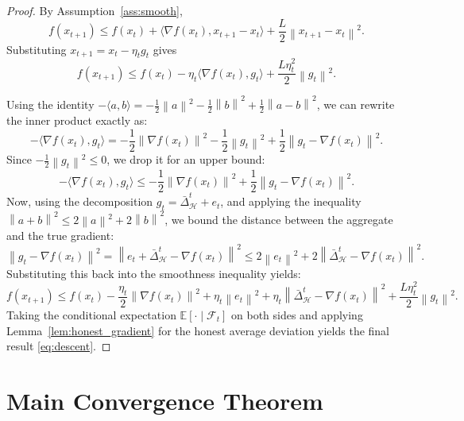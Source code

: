 \documentclass[11pt,a4paper]{article}
\theoremstyle{remark}
\newcommand{\E}{\mathbb{E}}
\newcommand{\F}{\mathcal{F}}
\newcommand{\HH}{\mathcal{H}}
\newcommand{\norm}[1]{\left\lVert #1 \right\rVert}
\begin{document}
\begin{proof}
By Assumption~\ref{ass:smooth},
\[
    f(x_{t+1})
    \le
    f(x_t)
    +
    \langle \nabla f(x_t), x_{t+1}-x_t \rangle
    +
    \frac{L}{2}\norm{x_{t+1}-x_t}^2.
\]
Substituting \(x_{t+1}=x_t-\eta_t g_t\) gives
\[
    f(x_{t+1})
    \le
    f(x_t)
    -
    \eta_t \langle \nabla f(x_t), g_t \rangle
    +
    \frac{L\eta_t^2}{2}\norm{g_t}^2.
\]

Using the identity \(-\langle a, b \rangle = -\frac{1}{2}\norm{a}^2 - \frac{1}{2}\norm{b}^2 + \frac{1}{2}\norm{a-b}^2\), we can rewrite the inner product exactly as:
\[
    -\langle \nabla f(x_t), g_t \rangle
    =
    -\frac{1}{2}\norm{\nabla f(x_t)}^2
    - \frac{1}{2}\norm{g_t}^2
    + \frac{1}{2}\norm{g_t - \nabla f(x_t)}^2.
\]
Since \(-\frac{1}{2}\norm{g_t}^2 \le 0\), we drop it for an upper bound:
\[
    -\langle \nabla f(x_t), g_t \rangle
    \le
    -\frac{1}{2}\norm{\nabla f(x_t)}^2
    + \frac{1}{2}\norm{g_t - \nabla f(x_t)}^2.
\]
Now, using the decomposition \(g_t = \bar{\Delta}_{\HH}^t + e_t\), and applying the inequality \(\norm{a+b}^2 \le 2\norm{a}^2 + 2\norm{b}^2\), we bound the distance between the aggregate and the true gradient:
\[
    \norm{g_t - \nabla f(x_t)}^2
    =
    \norm{e_t + \bar{\Delta}_{\HH}^t - \nabla f(x_t)}^2
    \le
    2\norm{e_t}^2 + 2\norm{\bar{\Delta}_{\HH}^t - \nabla f(x_t)}^2.
\]
Substituting this back into the smoothness inequality yields:
\[
    f(x_{t+1})
    \le
    f(x_t)
    - \frac{\eta_t}{2}\norm{\nabla f(x_t)}^2
    + \eta_t\norm{e_t}^2
    + \eta_t\norm{\bar{\Delta}_{\HH}^t - \nabla f(x_t)}^2
    + \frac{L\eta_t^2}{2}\norm{g_t}^2.
\]
Taking the conditional expectation \(\E[\cdot \mid \F_t]\) on both sides and applying Lemma~\ref{lem:honest_gradient} for the honest average deviation yields the final result \eqref{eq:descent}.
\end{proof}

\section{Main Convergence Theorem}
\end{document}
